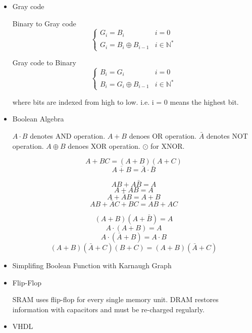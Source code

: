 \begin{itemize}

 \item{Gray code}

Binary to Gray code
$$ \left\{ \begin{array}{lc}
  G_{i} = B_{i} & i = 0 \\
  G_{i} = B_{i} \oplus B_{i - 1} & i \in \mathbb{N}^{*}
  \end{array} \right. $$

Gray code to Binary
$$ \left\{ \begin{array}{lc}
  B_{i} = G_{i} & i = 0 \\
  B_{i} = G_{i} \oplus B_{i - 1} & i \in \mathbb{N}^{*}
  \end{array} \right. $$

where bits are indexed from high to low.
i.e. i = 0 means the highest bit.

 \item{Boolean Algebra}

$A\cdot B$ denotes AND operation.
$A + B$ denoes OR operation.
$\bar{A}$ denotes NOT operation.
$A\oplus B$ denoes XOR operation.
$\odot$ for XNOR.

$$ A+BC=(A+B)(A+C) $$
$$ \overline{A+B} = \bar{A}\cdot\bar{B} $$

$$ AB+A\bar{B}=A $$
$$ A+AB=A $$
$$ A+\bar{A}B=A+B $$
$$ AB+\bar{A}C+BC=AB+AC $$

$$ (A+B)(A+\bar{B})=A $$
$$ A\cdot (A+B) = A $$
$$ A\cdot (\bar{A}+B)=A\cdot B $$
$$ (A+B)(\bar{A}+C)(B+C) = (A+B)(\bar{A}+C) $$

 \item{Simplifing Boolean Function with Karnaugh Graph}

 \item{Flip-Flop}

 SRAM uses flip-flop for every single memory unit.
 DRAM restores information with capacitors and must be re-charged regularly.

 \item{VHDL}

\end{itemize}
